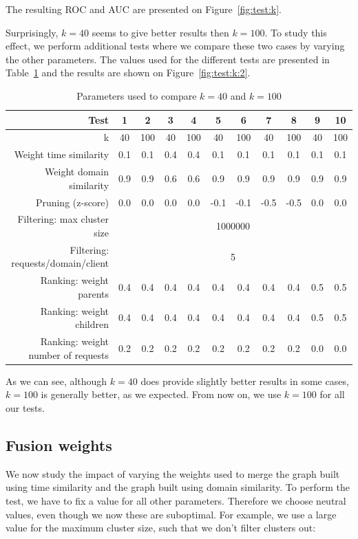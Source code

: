 \documentclass[conference]{IEEEtran}
\begin{document}
The resulting ROC and AUC are presented on Figure~\ref{fig:test:k}.

Surprisingly, $k = 40$ seems to give better results then $k = 100$. To study this effect, we perform additional tests where we compare these two cases by varying the other parameters. The values used for the different tests are presented in Table~\ref{table:k} and the results are shown on Figure~\ref{fig:test:k:2}.

\begin{table}
  \centering
  \begin{tabular}{rcccccccccc}
  \hline
  Test & 1 & 2 & 3 & 4 & 5 & 6 & 7 & 8 & 9 & 10 \\ \hline
  k & 40 & 100 & 40 & 100 & 40 & 100 & 40 & 100 & 40 & 100 \\
  Weight time similarity & 0.1 & 0.1 & 0.4 & 0.4 & 0.1 & 0.1 & 0.1 & 0.1 & 0.1 & 0.1 \\ 
  Weight domain similarity & 0.9 & 0.9 & 0.6 & 0.6 & 0.9 & 0.9 & 0.9 & 0.9 & 0.9 & 0.9 \\ 
  Pruning (z-score) & 0.0 & 0.0 & 0.0 & 0.0 & -0.1 & -0.1 & -0.5 & -0.5 & 0.0 & 0.0 \\ 
  \hline
  Filtering: max cluster size & \multicolumn{10}{c}{1000000} \\ 
  Filtering: requests/domain/client & \multicolumn{10}{c}{5} \\ 
  \hline
  Ranking: weight parents & 0.4 & 0.4 & 0.4 & 0.4 & 0.4 & 0.4 & 0.4 & 0.4 & 0.5 & 0.5 \\ 
  Ranking: weight children & 0.4 & 0.4 & 0.4 & 0.4 & 0.4 & 0.4 & 0.4 & 0.4 & 0.5 & 0.5 \\ 
  Ranking: weight number of requests & 0.2 & 0.2 & 0.2 & 0.2 & 0.2 & 0.2 & 0.2 & 0.2 & 0.0 & 0.0 \\
  \hline
  \end{tabular}
  \caption{Parameters used to compare $k = 40$ and $k = 100$}
  \label{table:k}
\end{table}

As we can see, although $k = 40$ does provide slightly better results in some cases, $k = 100$ is generally better, as we expected. From now on, we use $k = 100$ for all our tests.

\subsection{Fusion weights}

We now study the impact of varying the weights used to merge the graph built using time similarity and the graph built using domain similarity. To perform the test, we have to fix a value for all other parameters. Therefore we choose neutral values, even though we now these are suboptimal. For example, we use a large value for the maximum cluster size, such that we don't filter clusters out:
\end{document}
